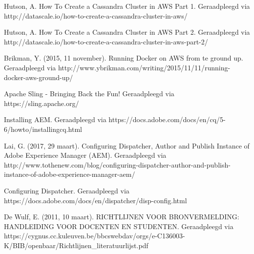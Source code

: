 Hutson, A.	
How To Create a Cassandra Cluster in AWS Part 1.
Geraadpleegd via
http://datascale.io/how-to-create-a-cassandra-cluster-in-aws/
\par
Hutson, A.	
How To Create a Cassandra Cluster in AWS Part 2. 
Geraadpleegd via 
http://datascale.io/how-to-create-a-cassandra-cluster-in-aws-part-2/
\par
Brikman, Y.
(2015, 11 november).
Running Docker on AWS from te ground up. 
Geraadpleegd via 
http://www.ybrikman.com/writing/2015/11/11/running-docker-aws-ground-up/
\par
Apache Sling - Bringing Back the Fun!
Geraadpleegd via 
https://sling.apache.org/
\par
Installing AEM.
Geraadpleegd via 
https://docs.adobe.com/docs/en/cq/5-6/howto/installingcq.html
\par
Lai, G.
(2017, 29 maart).
Configuring Dispatcher, Author and Publish Instance of Adobe Experience Manager (AEM).
Geraadpleegd via 
http://www.tothenew.com/blog/configuring-dispatcher-author-and-publish-instance-of-adobe-experience-manager-aem/
\par
Configuring Dispatcher. 
Geraadpleegd via 
https://docs.adobe.com/docs/en/dispatcher/disp-config.html 
\par
De Wulf, E.
(2011, 10 maart).
RICHTLIJNEN VOOR BRONVERMELDING: HANDLEIDING VOOR DOCENTEN EN STUDENTEN. 
Geraadpleegd via 
https://cygnus.cc.kuleuven.be/bbcswebdav/orgs/e-C136003-K/BIB/openbaar/Richtlijnen\_literatuurlijst.pdf